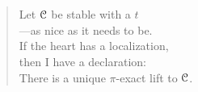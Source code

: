 
\thispagestyle{plain}
\section*{}

\vspace*{7cm}


\begin{verse}
    \hspace{8em}Let $\EuScript{C}$ be stable with a $t$ \\
    \vspace{5pt}
    \hspace{8em}---as nice as it needs to be. \\
    \vspace{5pt}
    \hspace{8em}If the heart has a localization, \\
    \vspace{5pt}
    \hspace{8em}then I have a declaration: \\
    \vspace{5pt}
    \hspace{8em}There is a unique $\pi$-exact lift to $\EuScript{C}$. 

\end{verse}